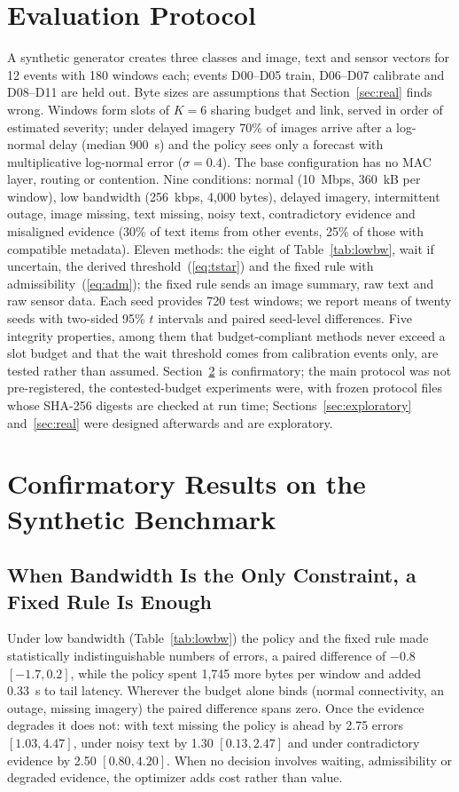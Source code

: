 \section{Evaluation Protocol}
\label{sec:workload}
A synthetic generator creates three classes and image, text and sensor vectors for 12 events with 180 windows each; events D00--D05 train, D06--D07 calibrate and D08--D11 are held out. Byte sizes are assumptions that Section~\ref{sec:real} finds wrong. Windows form slots of $K=6$ sharing budget and link, served in order of estimated severity; under delayed imagery 70\% of images arrive after a log-normal delay (median 900~s) and the policy sees only a forecast with multiplicative log-normal error ($\sigma=0.4$). The base configuration has no MAC layer, routing or contention. Nine conditions: normal (10~Mbps, 360~kB per window), low bandwidth (256~kbps, 4,000 bytes), delayed imagery, intermittent outage, image missing, text missing, noisy text, contradictory evidence and misaligned evidence (30\% of text items from other events, 25\% of those with compatible metadata). Eleven methods: the eight of Table~\ref{tab:lowbw}, wait if uncertain, the derived threshold~(\ref{eq:tstar}) and the fixed rule with admissibility~(\ref{eq:adm}); the fixed rule sends an image summary, raw text and raw sensor data. Each seed provides 720 test windows; we report means of twenty seeds with two-sided 95\% $t$ intervals and paired seed-level differences. Five integrity properties, among them that budget-compliant methods never exceed a slot budget and that the wait threshold comes from calibration events only, are tested rather than assumed. Section~\ref{sec:results} is confirmatory; the main protocol was not pre-registered, the contested-budget experiments were, with frozen protocol files whose SHA-256 digests are checked at run time; Sections~\ref{sec:exploratory} and~\ref{sec:real} were designed afterwards and are exploratory.

\section{Confirmatory Results on the Synthetic Benchmark}
\label{sec:results}
\subsection{When Bandwidth Is the Only Constraint, a Fixed Rule Is Enough}
Under low bandwidth (Table~\ref{tab:lowbw}) the policy and the fixed rule made statistically indistinguishable numbers of errors, a paired difference of $-0.8$ $[-1.7, 0.2]$, while the policy spent 1,745 more bytes per window and added 0.33~s to tail latency. Wherever the budget alone binds (normal connectivity, an outage, missing imagery) the paired difference spans zero. Once the evidence degrades it does not: with text missing the policy is ahead by 2.75 errors $[1.03, 4.47]$, under noisy text by 1.30 $[0.13, 2.47]$ and under contradictory evidence by 2.50 $[0.80, 4.20]$. When no decision involves waiting, admissibility or degraded evidence, the optimizer adds cost rather than value.


